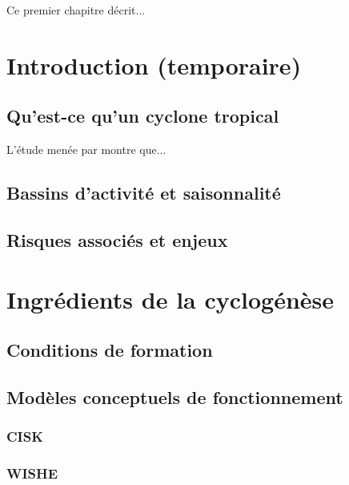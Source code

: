 \documentclass[../main.tex]{subfiles}
\begin{document}
\begin{itshape}
Ce premier chapitre décrit...
\end{itshape}

\minitoc
\section{Introduction (temporaire)}

\subsection{Qu'est-ce qu'un cyclone tropical}

L'étude menée par \autocite{chauvin_response_2006} montre que...

\subsection{Bassins d'activité et saisonnalité}

\subsection{Risques associés et enjeux}

\section{Ingrédients de la cyclogénèse}
  
\subsection{Conditions de formation}

\subsection{Modèles conceptuels de fonctionnement}

\subsubsection{CISK}

\subsubsection{WISHE}
\end{document}

